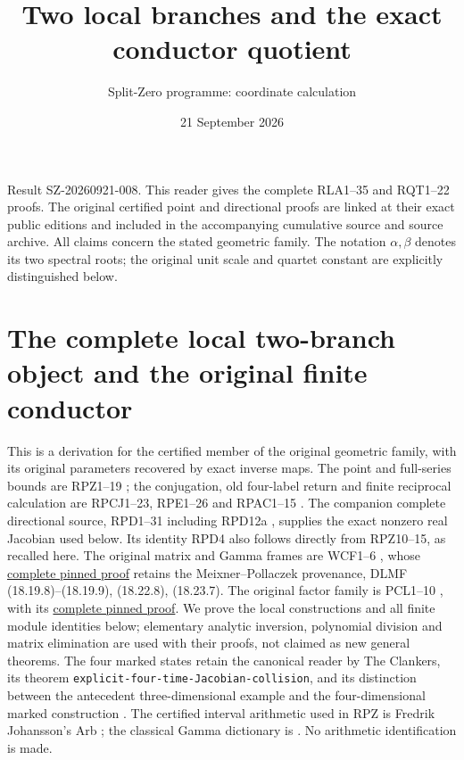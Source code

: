\documentclass[11pt]{article}
\title{Two local branches and the exact conductor quotient}
\author{Split-Zero programme: coordinate calculation}
\date{21 September 2026}
\begin{document}
\maketitle
\noindent Result SZ-20260921-008.  This reader gives the complete
RLA1--35 and RQT1--22 proofs.  The original certified point and
directional proofs are linked at their exact public editions and
included in the accompanying cumulative source and source archive.
All claims concern the stated geometric family.  The notation
$\alpha,\beta$ denotes its two spectral roots; the original unit
scale and quartet constant are explicitly distinguished below.
\tableofcontents\clearpage
\section{The complete local two-branch object and the original finite conductor}
\label{sec:real-pair-local-algebra}

This is a derivation for the certified member of the original geometric
family, with its original parameters recovered by exact inverse maps.
The point and full-series bounds are RPZ1--19 \cite{RPZ005};
the conjugation, old four-label return and finite reciprocal calculation
are RPCJ1--23, RPE1--26 and RPAC1--15
\cite{RPCJ005,RPE005,RPAC005}.
The companion complete directional source, RPD1--31 including RPD12a
\cite{RPD006,RPD31Source},
supplies the exact nonzero real Jacobian used below.  Its identity
RPD4 also follows directly from RPZ10--15, as recalled here.
The original matrix and Gamma frames are WCF1--6 \cite{WCF}, whose
\href{https://github.com/KokunoYumeto/zeta-function-research-reader/blob/5992ad50c0f2a06921f1fcaded7b4e38097c0739/workbenches/splitzero-tandem/continuations/20260920-original-kernel-mixed-determinants/providers/WEIGHTED_CONDUCTOR_FORWARD.tex#L28}{complete pinned proof}
retains the Meixner--Pollaczek provenance, DLMF
(18.19.8)--(18.19.9), (18.22.8), (18.23.7).
The original factor family is PCL1--10 \cite{PCLOriginal}, with its
\href{https://github.com/KokunoYumeto/zeta-function-research-reader/blob/487253b5b01851da5b9b98af4e146fecf1fab902/workbenches/splitzero-tandem/continuations/20260919-native-conductor-coprimality/providers/PCL_COMPLETE.tex#L19}{complete pinned proof}.
We prove the local constructions and all finite module identities below;
elementary analytic inversion, polynomial division and matrix elimination
are used with their proofs, not claimed as new general theorems.
The four marked states retain the canonical reader by The Clankers,
its theorem \texttt{explicit-four-time-Jacobian-collision}, and its
distinction between the antecedent three-dimensional example and the
four-dimensional marked construction \cite{ES488}.  The certified
interval arithmetic used in RPZ is Fredrik Johansson's Arb
\cite{human:arb2016}; the classical Gamma dictionary is
\cite{DLMF18Source}.  No arithmetic identification is made.
\end{document}
